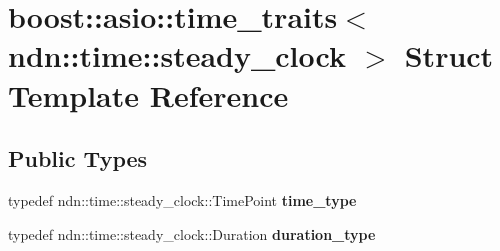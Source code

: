 \hypertarget{structboost_1_1asio_1_1time__traits_3_01ndn_1_1time_1_1steady__clock_01_4}{}\section{boost\+:\+:asio\+:\+:time\+\_\+traits$<$ ndn\+:\+:time\+:\+:steady\+\_\+clock $>$ Struct Template Reference}
\label{structboost_1_1asio_1_1time__traits_3_01ndn_1_1time_1_1steady__clock_01_4}
\subsection*{Public Types}
\begin{DoxyCompactItemize}
\item 
typedef ndn\+::time\+::steady\+\_\+clock\+::\+Time\+Point {\bfseries time\+\_\+type}\hypertarget{structboost_1_1asio_1_1time__traits_3_01ndn_1_1time_1_1steady__clock_01_4_aed733e61317151b4c0e68116cc1c1501}{}\label{structboost_1_1asio_1_1time__traits_3_01ndn_1_1time_1_1steady__clock_01_4_aed733e61317151b4c0e68116cc1c1501}

\item 
typedef ndn\+::time\+::steady\+\_\+clock\+::\+Duration {\bfseries duration\+\_\+type}\hypertarget{structboost_1_1asio_1_1time__traits_3_01ndn_1_1time_1_1steady__clock_01_4_aa5fb91d4a128b80d958e15504f245b3d}{}\label{structboost_1_1asio_1_1time__traits_3_01ndn_1_1time_1_1steady__clock_01_4_aa5fb91d4a128b80d958e15504f245b3d}

\end{DoxyCompactItemize}
